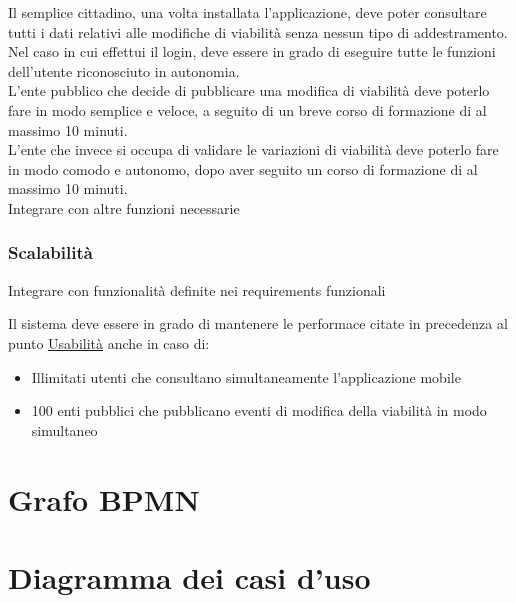 \documentclass{article}
\begin{document}
Il semplice cittadino, una volta installata l'applicazione, deve poter consultare tutti i dati relativi alle modifiche di viabilità senza nessun tipo di addestramento. Nel caso in cui effettui il login, deve essere in grado di eseguire tutte le funzioni dell'utente riconosciuto in autonomia.\\
L'ente pubblico che decide di pubblicare una modifica di viabilità deve poterlo fare in modo semplice e veloce, a seguito di un breve corso di formazione di al massimo 10 minuti.\\
L'ente che invece si occupa di validare le variazioni di viabilità deve poterlo fare in modo comodo e autonomo, dopo aver seguito un corso di formazione di al massimo 10 minuti.\\

Integrare con altre funzioni necessarie

\subsubsection{Scalabilità}

Integrare con funzionalità definite nei requirements funzionali

Il sistema deve essere in grado di mantenere le performace citate in precedenza al punto \hyperref[useCase:Usabilità]{Usabilità} anche in caso di:
\begin{itemize}
    \item Illimitati utenti che consultano simultaneamente l'applicazione mobile
    \item 100 enti pubblici che pubblicano eventi di modifica della viabilità in modo simultaneo
\end{itemize}
\clearpage

\section{Grafo BPMN}
\clearpage

\section{Diagramma dei casi d'uso}

\end{document}
